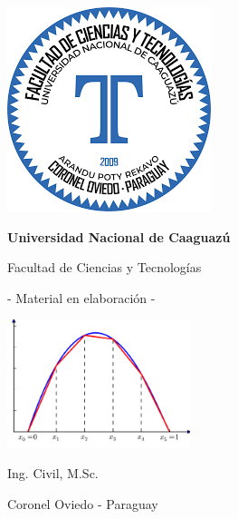 
\begin{titlepage}
	\begin{center}
	
		\includegraphics[width=.2\textwidth]{figs/portada/LogoFCyT}
		
		\Large
		\textbf{Universidad Nacional de Caaguazú}
		
		\vspace{0.3cm}
		\Large
		Facultad de Ciencias y Tecnologías
		
		\vspace{1.2cm}
		
		\textbf{\Titulo}
		
		\subTitulo
		
		- Material en elaboración - 
		
		\vspace{1cm}
		
		\includegraphics[width=0.4\textwidth]{figs/portada/fem}
		
		\vspace{1.2cm}
		
		\textbf{\yo}
		
		Ing. Civil, M.Sc.
		
		\vspace{0.8cm}
		
		\large
		Coronel Oviedo - Paraguay
		
		\fecha
		
	\end{center}
\end{titlepage}

\restoregeometry